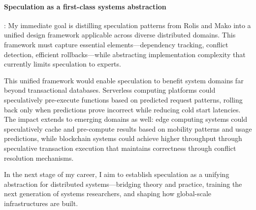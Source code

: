 \documentclass[11pt,letterpaper]{article}
\begin{document}
\paragraph{Speculation as a first-class systems abstraction}: My immediate goal is distilling speculation patterns from Rolis and Mako into a unified design framework applicable across diverse distributed domains. This framework must capture essential elements—dependency tracking, conflict detection, efficient rollbacks—while abstracting implementation complexity that currently limits speculation to experts.

This unified framework would enable speculation to benefit system domains far beyond transactional databases. 
Serverless computing platforms could speculatively pre-execute functions based on predicted request patterns, rolling back only when predictions prove incorrect while reducing cold start latencies.
The impact extends to emerging domains as well: edge computing systems could speculatively cache and pre-compute results based on mobility patterns and usage predictions, while blockchain systems could achieve higher throughput through speculative transaction execution that maintains correctness through conflict resolution mechanisms.

In the next stage of my career, I aim to establish speculation as a unifying abstraction for distributed systems—bridging theory and practice, training the next generation of systems researchers, and shaping how global-scale infrastructures are built.

\printbibliography
\end{document}
